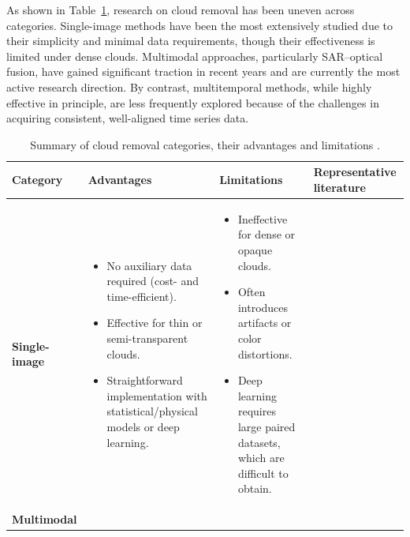 As shown in Table~\ref{tab:cloud_removal_categories}, research on cloud removal has been uneven across categories. Single-image methods have been the most extensively studied due to their simplicity and minimal data requirements, though their effectiveness is limited under dense clouds. Multimodal approaches, particularly SAR–optical fusion, have gained significant traction in recent years and are currently the most active research direction. By contrast, multitemporal methods, while highly effective in principle, are less frequently explored because of the challenges in acquiring consistent, well-aligned time series data.

\begin{table}[ht]
\centering
\caption{Summary of cloud removal categories, their advantages and limitations \cite{CR_Advances_Review_ORS, sar_2_opt_CGAN_survey_taxonomy}.}
\label{tab:cloud_removal_categories}
\begin{adjustbox}{max width=\textwidth, keepaspectratio=false}
\begin{tabular}{p{2.5cm} p{6cm} p{6cm} p{3cm}}
\toprule
\textbf{Category} & \textbf{Advantages} & \textbf{Limitations} & \textbf{Representative literature} \\
\midrule
\textbf{Single-image} & 
\begin{itemize}[nosep,leftmargin=*]
  \item No auxiliary data required (cost- and time-efficient).
  \item Effective for thin or semi-transparent clouds.
  \item Straightforward implementation with statistical/physical models or deep learning.
\end{itemize} &
\begin{itemize}[nosep,leftmargin=*]
  \item Ineffective for dense or opaque clouds.
  \item Often introduces artifacts or color distortions.
  \item Deep learning requires large paired datasets, which are difficult to obtain.
\end{itemize} &
\cite{single_variation} \cite{single_haze_removal_dark_prior} \cite{single_artifact_free_CR_GAN} \cite{single_thin_CR_ORS_GAN_phys} \cite{single_multi_DR_CR} \cite{single_CR_DLM_matting} \cite{single_AGLC_GAN} \cite{single_PNBT_CR} \cite{single_CGAN_scattering_martian} \\
\midrule
\textbf{Multimodal} &
\begin{itemize}[nosep,leftmargin=*]

\end{itemize}
\end{tabular}
\end{adjustbox}
\end{table}
